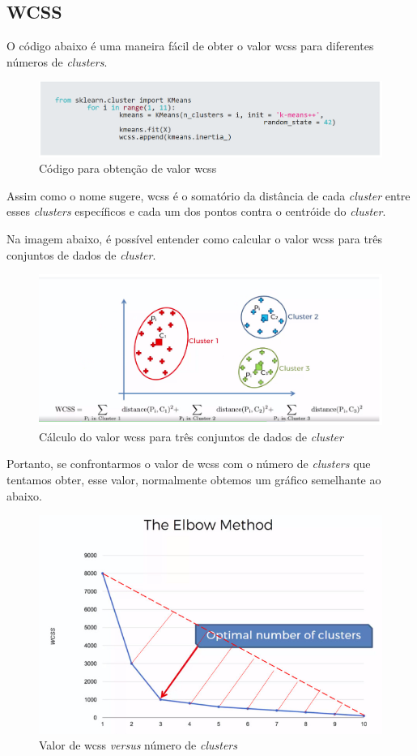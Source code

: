 \documentclass[12pt, a4paper, oneside]{scrreport}
\begin{document}
\subsection{WCSS}
O código abaixo é uma maneira fácil de obter o valor wcss para diferentes números de \textit{clusters}.\par
\begin{figure}
  \centering
  \includegraphics[scale=0.5]{1.png}
  \caption{Código para obtenção de valor wcss}   
  \label{fig:picture}
\end{figure}
Assim como o nome sugere, wcss é o somatório da distância de cada \textit{cluster} entre esses \textit{clusters} específicos e cada um dos pontos contra o centróide do \textit{cluster}.\par
Na imagem abaixo, é possível entender como calcular o valor wcss para três conjuntos de dados de \textit{cluster}.\par
\begin{figure}
  \centering
  \includegraphics[scale=0.5]{2.png}
  \caption{Cálculo do valor wcss para três conjuntos de dados de \textit{cluster}}  
  \label{fig:picture}
\end{figure}
Portanto, se confrontarmos o valor de wcss com o número de \textit{clusters} que tentamos obter, esse valor, normalmente obtemos um gráfico semelhante ao abaixo.\par
\begin{figure}
  \centering
  \includegraphics[scale=0.5]{3.png}
  \caption{Valor de wcss \textit{versus} número de \textit{clusters}}   
  \label{fig:picture}
\end{figure}
\end{document}

